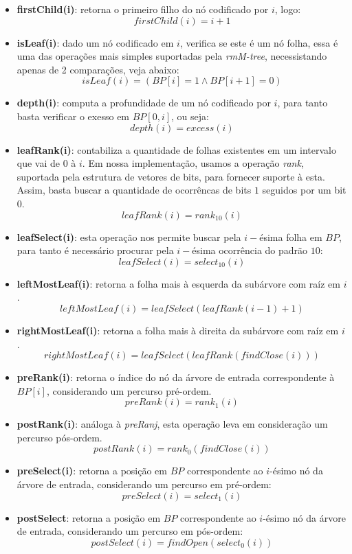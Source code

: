         \begin{itemize}
            \item \textbf{firstChild(i)}: retorna o primeiro filho do nó codificado por $i$, logo:
            $$firstChild(i) = i +1$$
            \item \textbf{isLeaf(i)}: dado um nó codificado em $i$, verifica se este é um nó folha, essa é uma das operações mais simples suportadas pela \textit{rmM-tree}, necessistando apenas de 2 comparações, veja abaixo:
            $$isLeaf(i) = (BP[i] = 1 \land BP[i+1]=0)$$
            \item \textbf{depth(i)}: computa a profundidade de um nó codificado por $i$, para tanto basta verificar o exesso em $BP[0,i]$, ou seja:
            $$depth(i) = excess(i)$$
            \item \textbf{leafRank(i)}: contabiliza a quantidade de folhas existentes em um intervalo que vai de $0$ à $i$. Em nossa implementação, usamos a operação \textit{rank},
            suportada pela estrutura de vetores de bits, para fornecer suporte à esta. Assim, basta buscar a quantidade de ocorrêncas de bits $1$ seguidos por um bit $0$.
            $$leafRank(i) = rank_{10}(i)$$
            \item \textbf{leafSelect(i)}: esta operação nos permite buscar pela $i-$ésima folha em $BP$, para tanto é necessário procurar pela $i-$ésima ocorrência do padrão $10$:
            $$leafSelect(i) = select_{10}(i)$$
            \item \textbf{leftMostLeaf(i)}: retorna a folha mais à esquerda da subárvore com raíz em $i$.
            $$leftMostLeaf(i) = leafSelect(leafRank(i-1)+1)$$
            \item  \textbf{rightMostLeaf(i)}: retorna a folha mais à direita da subárvore com raíz em $i$.
            $$rightMostLeaf(i) = leafSelect(leafRank(findClose(i)))$$
            \item \textbf{preRank(i)}: retorna o índice do nó da árvore de entrada correspondente à $BP[i]$,  considerando um percurso pré-ordem.
            $$preRank(i) = rank_1(i)$$
            \item \textbf{postRank(i)}: análoga à \textit{preRanj}, esta operação leva em consideração um percurso pós-ordem.
            $$postRank(i) = rank_0(findClose(i))$$
            \item \textbf{preSelect(i)}: retorna a posição em $BP$ correspondente ao $i$-ésimo nó da árvore de entrada, considerando um percurso em pré-ordem:
            $$preSelect(i) = select_1(i)$$
            \item \textbf{postSelect}: retorna a posição em $BP$ correspondente ao $i$-ésimo nó da árvore de entrada, considerando um percurso em pós-ordem:
            $$postSelect(i) = findOpen(select_0(i))$$
        \end{itemize} 

